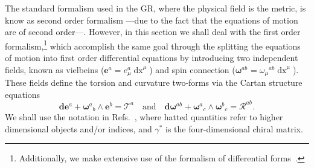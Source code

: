 \documentclass{ws-mpla}
\newcommand{\df}[1][]{\mathbf{d}{#1}}
\newcommand{\ga}{\gamma}
\newcommand{\we}{{\scriptstyle\wedge}}
\newcommand\vi[2]{e^{{#1}}_{{#2}}}
\newcommand\vif[1]{\boldsymbol{e}^{{#1}}}
\newcommand\spi[1]{\omega_{{#1}}}
\newcommand\spif[2]{{\boldsymbol{\omega}}^{{#1}}{}_{{#2}}}
\newcommand{\Rif}[2]{\boldsymbol{\mathcal{R}}^{{#1}}{}_{{#2}}}
\newcommand{\Tf}[1]{\boldsymbol{\mathcal{T}}^{#1}}
\renewcommand{\(}{\left(}
\renewcommand{\)}{\right)}
\renewcommand{\[}{\left[}
\renewcommand{\]}{\right]}
\newcommand*{\de}[1]{\mathop{\mathrm{d}#1}\nolimits}
\begin{document}
The standard formalism used in the GR, where the physical field is the metric, is know as second order formalism ---due to the fact that the equations of motion are of second order---. However, in this section we shall deal with the first order formalism,\footnote{Additionally, we make extensive use of the formalism of differential forms~\cite{Cartan-calc,Zanelli:2005sa}.} which accomplish the same goal through the splitting the equations of motion into first order differential equations  by introducing two independent fields, known as vielbeins \mbox{($\vif{a} = \vi{a}{\mu}\de{x}^\mu$)} and spin connection \mbox{($\spif{ab}{} = \spi{\mu}{}^{ab}\de{x}^\mu$).} These fields define the torsion and curvature two-forms via the Cartan structure equations
\begin{equation}
  \df[\vif{a}] + \spif{a}{b} \we \vif{b} = \Tf{a} \quad \text{and} \quad \df[\spif{ab}{}] + \spif{a}{c} \we \spif{b}{c} = \Rif{ab}{}.
\end{equation}
We shall use the notation in Refs.~, where hatted quantities refer to higher dimensional objects and/or indices, and $\ga^{*}$ is the four-dimensional chiral matrix.
\end{document}
